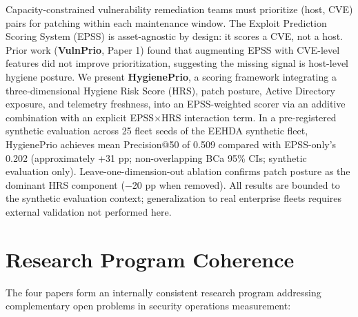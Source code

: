 \documentclass[12pt,letterpaper]{article}
\newenvironment{exhibitbox}{%
  \begin{mdframed}[backgroundcolor=lightblue,linecolor=headblue,linewidth=1.5pt,
                   topline=true,bottomline=true,leftline=true,rightline=true,
                   innertopmargin=12pt,innerbottommargin=12pt,
                   innerleftmargin=14pt,innerrightmargin=14pt]
}{%
  \end{mdframed}
}
\begin{document}
\begin{exhibitbox}
Capacity-constrained vulnerability remediation teams must prioritize (host, CVE)
pairs for patching within each maintenance window. The Exploit Prediction Scoring
System (EPSS) is asset-agnostic by design: it scores a CVE, not a host. Prior
work (\textbf{VulnPrio}, Paper 1) found that augmenting EPSS with CVE-level
features did not improve prioritization, suggesting the missing signal is
host-level hygiene posture. We present \textbf{HygienePrio}, a scoring framework
integrating a three-dimensional Hygiene Risk Score (HRS), patch posture, Active
Directory exposure, and telemetry freshness, into an EPSS-weighted scorer via
an additive combination with an explicit EPSS$\times$HRS interaction term.
In a pre-registered synthetic evaluation across 25 fleet seeds of the EEHDA
synthetic fleet, HygienePrio achieves mean Precision@50 of 0.509 compared with
EPSS-only's 0.202 (approximately +31 pp; non-overlapping BCa 95\% CIs; synthetic
evaluation only). Leave-one-dimension-out ablation confirms patch posture as the
dominant HRS component ($-$20 pp when removed). All results are bounded to the
synthetic evaluation context; generalization to real enterprise fleets requires
external validation not performed here.
\end{exhibitbox}

\newpage

\section{Research Program Coherence}

The four papers form an internally consistent research program addressing
complementary open problems in security operations measurement:
\end{document}
